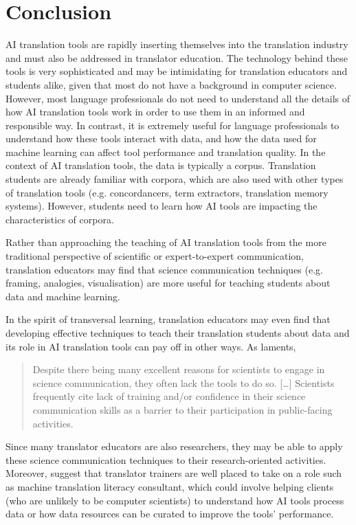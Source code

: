 \documentclass[output=paper]{langscibook}
\begin{document}
\section{Conclusion}
AI translation tools are rapidly inserting themselves into the translation industry and must also be addressed in translator education. The technology behind these tools is very sophisticated and may be intimidating for translation educators and students alike, given that most do not have a background in computer science. However, most language professionals do not need to understand all the details of how AI translation tools work in order to use them in an informed and responsible way. In contrast, it is extremely useful for language professionals to understand how these tools interact with data, and how the data used for machine learning can affect tool performance and translation quality. In the context of AI translation tools, the data is typically a corpus. Translation students are already familiar with corpora, which are also used with other types of translation tools (e.g. concordancers, term extractors, translation memory systems). However, students need to learn how AI tools are impacting the characteristics of corpora. 

Rather than approaching the teaching of AI translation tools from the more traditional perspective of scientific or expert-to-expert communication, translation educators may find that science communication techniques (e.g. framing, analogies, visualisation) are more useful for teaching students about data and machine learning. 

In the spirit of transversal learning, translation educators may even find that developing effective techniques to teach their translation students about data and its role in AI translation tools can pay off in other ways. As \citet[1]{borowiec2023} laments, 

\begin{quote}
Despite there being many excellent reasons for scientists to engage in science communication, they often lack the tools to do so. […] Scientists frequently cite lack of training and/or confidence in their science communication skills as a barrier to their participation in public-facing activities.
\end{quote}

Since many translator educators are also researchers, they may be able to apply these science communication techniques to their research-oriented activities. Moreover, \citet{ehrensberger-dowetal23} suggest that translator trainers are well placed to take on a role such as machine translation literacy consultant, which could involve helping clients (who are unlikely to be computer scientists) to understand how AI tools process data or how data resources can be curated to improve the tools’ performance.

\sloppy\printbibliography[heading=subbibliography,notkeyword=this]
\end{document}
